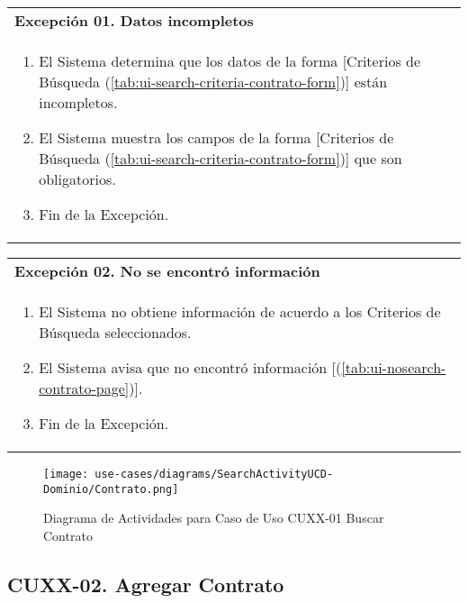 	\begin{tabular}{ p{15.5cm} }
		\textbf{Excepci\'on 01. Datos incompletos} \\
		\begin{enumerate}
			\item El Sistema determina que los datos de la forma [Criterios de B\'usqueda (\ref{tab:ui-search-criteria-contrato-form})] est\'an incompletos.
			\item El Sistema muestra los campos de la forma [Criterios de B\'usqueda (\ref{tab:ui-search-criteria-contrato-form})] que son obligatorios.
			\item Fin de la Excepci\'on.
		\end{enumerate}
	\end{tabular}
	
	\begin{tabular}{ p{15.5cm} }
		\textbf{Excepci\'on 02. No se encontr\'o informaci\'on} \\
		\begin{enumerate}
			\item El Sistema no obtiene informaci\'on de acuerdo a los Criterios de B\'usqueda seleccionados.
			\item El Sistema avisa que no encontr\'o informaci\'on [(\ref{tab:ui-nosearch-contrato-page})].
			\item Fin de la Excepci\'on.
		\end{enumerate}
	\end{tabular}
	
	\begin{figure}[H]
		\begin{center}
			\label{tab:activity-search-ucd-entity-contrato}
			\texttt{[image: use-cases/diagrams/SearchActivityUCD-Dominio/Contrato.png]}
			\caption{Diagrama de Actividades para Caso de Uso CUXX-01 Buscar Contrato}
	\end{center}
	\end{figure}
	\clearpage
	\subsection{CUXX-02. Agregar Contrato} \label{sec:cu-create-Contrato}
	

